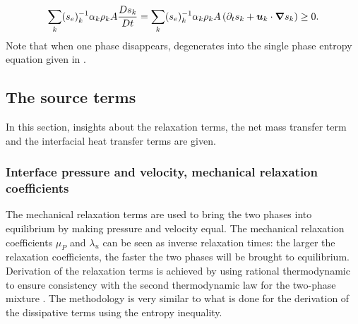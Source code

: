 %
\begin{equation}\label{eq:tot-ent-res-sct4}
\sum_k (s_{e})_k^{-1} \alpha_k \rho_k A \frac{Ds_k}{Dt} = \sum_k (s_{e})_k^{-1} \alpha_k \rho_k A \left( \partial_t s_k + \boldsymbol u_k \cdot \boldsymbol{\nabla} s_k \right) \geq 0.
\end{equation}
%
Note that when one phase disappears,  degenerates into the single phase entropy equation given in .
\subsection{The source terms}\label{sec:source-terms-7-eqt-sect5}
In this section, insights about the relaxation terms, the net mass transfer term and the interfacial heat transfer terms are given.
\subsubsection{Interface pressure and velocity, mechanical relaxation coefficients}
The mechanical relaxation terms are used to bring the two phases into equilibrium by making pressure and velocity equal. The mechanical relaxation coefficients $\mu_P$ and $\lambda_u$ can be seen as inverse relaxation times: the larger the relaxation coefficients, the faster the two phases will be brought to equilibrium. Derivation of the relaxation terms is achieved by using rational thermodynamic to ensure consistency with the second thermodynamic law for the two-phase mixture \cite{Truesdell}. The methodology is very similar to what is done for the derivation of the dissipative terms using the entropy inequality.


